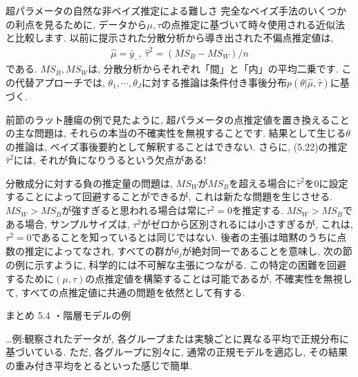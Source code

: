 \documentclass[10pt,dvipdfmx,a4]{beamer}
\newcommand{\eq}[1]{\begin{align}#1\end{align}}
\begin{document}

\begin{frame}{超パラメータの自然な非ベイズ推定による難しさ}
完全なベイズ手法のいくつかの利点を見るために, データから$\mu,\tau$の点推定に基づいて時々使用される近似法と比較します.
以前に提示された分散分析から導き出された不偏点推定値は,
\eq{\hat{\mu}=\bar{y}_{..},\ \hat{\tau}^2=(MS_B-MS_W)/n}
である.
$MS_B, MS_W$は, 分散分析からそれぞれ「間」と「内」の平均二乗です.
この代替アプローチでは, $\theta_1,\cdots,\theta_J$に対する推論は条件付き事後分布$p(\theta|\hat{\mu},\hat{\tau})$に基づく.

前節のラット腫瘍の例で見たように, 超パラメータの点推定値を置き換えることの主な問題は, それらの本当の不確実性を無視することです.
結果として生じる$\theta$の推論は, ベイズ事後要約として解釈することはできない.
さらに, (5.22)の推定$\hat{\tau}^2$には, それが負になりうるという欠点がある!
\end{frame}


\begin{frame}
分散成分に対する負の推定量の問題は, $MS_W$が$MS_B$を超える場合に$\hat{\tau}^2$を0に設定することによって回避することができるが, これは新たな問題を生じさせる.
$MS_W>MS_B$が強すぎると思われる場合は常に$\tau^2 =0$を推定する.
$MS_W>MS_B$である場合, サンプルサイズは, $\tau^2$がゼロから区別されるには小さすぎるが, これは, $\tau^2=0$であることを知っているとは同じではない.
後者の主張は暗黙のうちに点数の推定によってなされ, すべての群が$\theta_j$が絶対同一であることを意味し, 次の節の例に示すように, 科学的には不可解な主張につながる.
この特定の困難を回避するために$(\mu,\tau)$の点推定値を構築することは可能であるが, 不確実性を無視して, すべての点推定値に共通の問題を依然として有する.
\end{frame}


\begin{frame}{まとめ 5.4}
・階層モデルの例

…例:観察されたデータが, 各グループまたは実験ごとに異なる平均で正規分布に基づいている.
ただ, 各グループに別々に, 通常の正規モデルを適応し, その結果の重み付き平均をとるといった感じで簡単.

\end{frame}

\end{document}
